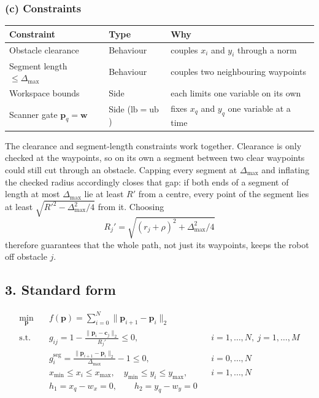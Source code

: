 \documentclass[11pt,a4paper]{article}
\begin{document}
\subsubsection*{(c) Constraints}

\begin{center}
\begin{tabular}{lll}
\toprule
Constraint & Type & Why \\
\midrule
Obstacle clearance     & Behaviour & couples $x_i$ and $y_i$ through a norm \\
Segment length $\le \Delta_{\max}$ & Behaviour & couples two neighbouring waypoints \\
Workspace bounds       & Side      & each limits one variable on its own \\
Scanner gate $\bm{p}_q = \bm{w}$ & Side ($\mathrm{lb}=\mathrm{ub}$) & fixes $x_q$ and $y_q$ one variable at a time \\
\bottomrule
\end{tabular}
\end{center}

The clearance and segment-length constraints work together. Clearance is only
checked at the waypoints, so on its own a segment between two clear waypoints
could still cut through an obstacle. Capping every segment at $\Delta_{\max}$
and inflating the checked radius accordingly closes that gap: if both ends of a
segment of length at most $\Delta_{\max}$ lie at least $R'$ from a centre, every
point of the segment lies at least $\sqrt{R'^2 - \Delta_{\max}^2/4}$ from it.
Choosing
\[
  R_j' = \sqrt{(r_j + \rho)^2 + \Delta_{\max}^2/4}
\]
therefore guarantees that the whole path, not just its waypoints, keeps the
robot off obstacle $j$.

\subsection*{3. Standard form}

\begin{align}
  \min_{\bm{p}} \quad & f(\bm{p}) = \sum_{i=0}^{N} \lVert \bm{p}_{i+1} - \bm{p}_i \rVert_2 \\[0.4em]
  \text{s.t.} \quad
  & g_{ij} = 1 - \frac{\lVert \bm{p}_i - \bm{c}_j \rVert_2}{R_j'} \le 0,
    && i = 1,\dots,N,\ j = 1,\dots,M \\[0.4em]
  & g_i^{\mathrm{seg}} = \frac{\lVert \bm{p}_{i+1} - \bm{p}_i \rVert_2}{\Delta_{\max}} - 1 \le 0,
    && i = 0,\dots,N \\[0.4em]
  & x_{\min} \le x_i \le x_{\max}, \quad y_{\min} \le y_i \le y_{\max},
    && i = 1,\dots,N \\[0.4em]
  & h_1 = x_q - w_x = 0, \qquad h_2 = y_q - w_y = 0
\end{align}
\end{document}
